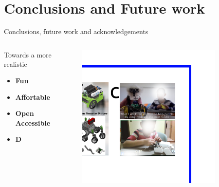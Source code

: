 \section{Conclusions and Future work}

{
\begin{frame}{Conclusions, future work and acknowledgements}

  \begin{columns}
    \begin{column}{.3\linewidth}
      Towards a more realistic
  \begin{itemize}
    \item \textbf{Fun}
    \item \textbf{Affortable}
    \item \textbf{Open Accessible}
    \item \textbf{D}
  \end{itemize}

    \end{column}


  \begin{column}{.6\linewidth}

      \begin{figure}
        \centering
        \includegraphics[width=0.9\textwidth]{./figures/future-work/versions/drawing-v00.png}
      \end{figure}

    \end{column}
  \end{columns}

\end{frame}
}


